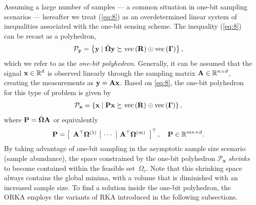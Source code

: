 \documentclass[12pt,draftcls,onecolumn]{IEEEtran}
\begin{document}
Assuming a large number of samples --- a common situation in one-bit sampling scenarios --- hereafter we treat (\ref{eq:8}) as an overdetermined linear system of inequalities associated with the one-bit sensing scheme.
The inequality (\ref{eq:8}) can be recast as a polyhedron,
\begin{equation}
\label{eq:8n}
\begin{aligned}
\mathcal{P}_{\mathbf{y}} = \left\{\mathbf{y} \mid \Tilde{\bOmega} \mathbf{y}\succeq \operatorname{vec}\left(\mbR\right)\odot \operatorname{vec}\left(\bGamma\right)\right\},
\end{aligned}
\end{equation}
which we refer to as the \emph{one-bit polyhedron}. Generally, it can be assumed that the signal $\mathbf{x}\in\mathbb{R}^{d}$ is observed linearly through the sampling matrix $\mathbf{A}\in\mathbb{R}^{n\times d}$, creating the measurements as $\mathbf{y}=\mathbf{A}\mathbf{x}$. Based on \eqref{eq:8}, the one-bit polyhedron for this type of problem is given by
\begin{equation}
\label{eq:80n}
\begin{aligned}
\mathcal{P}_{\mathbf{x}} = \left\{\mathbf{x} \mid \mbP \mathbf{x} \succeq \operatorname{vec}\left(\mbR\right)\odot \operatorname{vec}\left(\bGamma\right)\right\},
\end{aligned}
\end{equation}
where $\mathbf{P}=\Tilde{\boldsymbol{\Omega}}\mathbf{A}$ or equivalently
\begin{equation}
\label{eq:90}
\mbP=\left[\begin{array}{c|c|c}
\mbA^{\top}\bOmega^{(1)} &\cdots &\mbA^{\top}\bOmega^{(m)}
\end{array}\right]^{\top}, \quad \mbP\in\mathbb{R}^{m n\times d}.
\end{equation}\normalsize
By taking advantage of one-bit sampling in the asymptotic sample size scenario (sample abundance), the space constrained by the one-bit polyhedron $\mathcal{P}_{\mathbf{x}}$ \emph{shrinks} to become contained within the feasible set~$\Omega_c$. Note that this shrinking space always contains the global minima, with a volume that is diminished with an increased sample size. To find a solution inside the one-bit polyhedron, the ORKA employs the variants of RKA introduced in the following subsections. %
\end{document}
